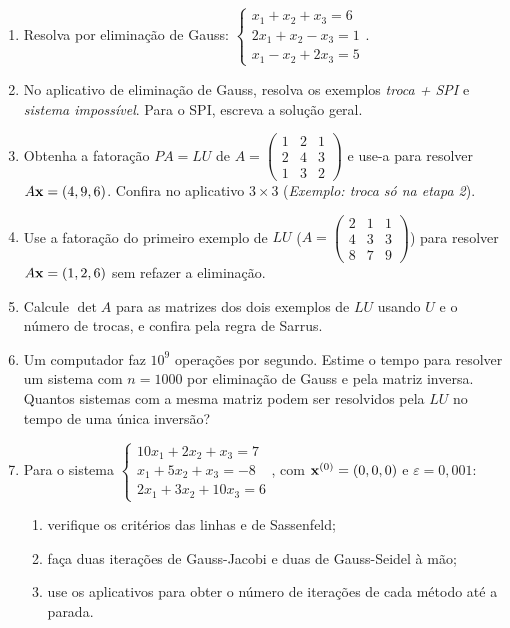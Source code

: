 \begin{enumerate}[label=\textbf{\arabic*.},leftmargin=*]
\item Resolva por eliminação de Gauss:
  $\begin{cases}x_1+x_2+x_3=6\\2x_1+x_2-x_3=1\\x_1-x_2+2x_3=5\end{cases}$.

\item No aplicativo de eliminação de Gauss, resolva os exemplos \emph{troca + SPI} e
  \emph{sistema impossível}. Para o SPI, escreva a solução geral.

\item Obtenha a fatoração $PA=LU$ de
  $A=\begin{pmatrix}1&2&1\\2&4&3\\1&3&2\end{pmatrix}$ e use-a para resolver $A\mathbf{x}=(4,9,6)$.
  Confira no aplicativo $3\times3$ (\emph{Exemplo: troca só na etapa 2}).

\item Use a fatoração do primeiro exemplo de $LU$ ($A=\left(\begin{smallmatrix}2&1&1\\4&3&3\\8&7&9\end{smallmatrix}\right)$)
  para resolver $A\mathbf{x}=(1,2,6)$ sem refazer a eliminação.

\item Calcule $\det A$ para as matrizes dos dois exemplos de $LU$ usando $U$ e o número de
  trocas, e confira pela regra de Sarrus.

\item Um computador faz $10^{9}$ operações por segundo. Estime o tempo para resolver um sistema
  com $n=1000$ por eliminação de Gauss e pela matriz inversa. Quantos sistemas com a mesma
  matriz podem ser resolvidos pela $LU$ no tempo de uma única inversão?

\item Para o sistema
  $\begin{cases}10x_1+2x_2+x_3=7\\x_1+5x_2+x_3=-8\\2x_1+3x_2+10x_3=6\end{cases}$,
  com $\mathbf{x}^{(0)}=(0,0,0)$ e $\varepsilon=0{,}001$:
  \begin{enumerate}[label=(\alph*),nosep]
  \item verifique os critérios das linhas e de Sassenfeld;
  \item faça duas iterações de Gauss-Jacobi e duas de Gauss-Seidel à mão;
  \item use os aplicativos para obter o número de iterações de cada método até a parada.
  \end{enumerate}


\end{enumerate}
